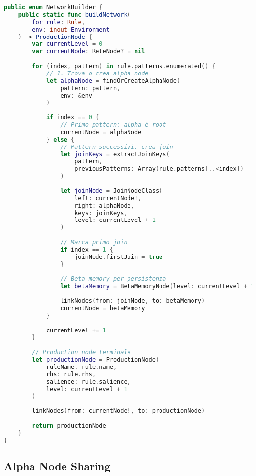 \begin{lstlisting}[language=Swift]
public enum NetworkBuilder {
    public static func buildNetwork(
        for rule: Rule,
        env: inout Environment
    ) -> ProductionNode {
        var currentLevel = 0
        var currentNode: ReteNode? = nil
        
        for (index, pattern) in rule.patterns.enumerated() {
            // 1. Trova o crea alpha node
            let alphaNode = findOrCreateAlphaNode(
                pattern: pattern,
                env: &env
            )
            
            if index == 0 {
                // Primo pattern: alpha è root
                currentNode = alphaNode
            } else {
                // Pattern successivi: crea join
                let joinKeys = extractJoinKeys(
                    pattern,
                    previousPatterns: Array(rule.patterns[..<index])
                )
                
                let joinNode = JoinNodeClass(
                    left: currentNode!,
                    right: alphaNode,
                    keys: joinKeys,
                    level: currentLevel + 1
                )
                
                // Marca primo join
                if index == 1 {
                    joinNode.firstJoin = true
                }
                
                // Beta memory per persistenza
                let betaMemory = BetaMemoryNode(level: currentLevel + 1)
                
                linkNodes(from: joinNode, to: betaMemory)
                currentNode = betaMemory
            }
            
            currentLevel += 1
        }
        
        // Production node terminale
        let productionNode = ProductionNode(
            ruleName: rule.name,
            rhs: rule.rhs,
            salience: rule.salience,
            level: currentLevel + 1
        )
        
        linkNodes(from: currentNode!, to: productionNode)
        
        return productionNode
    }
}
\end{lstlisting}

\subsection{Alpha Node Sharing}

